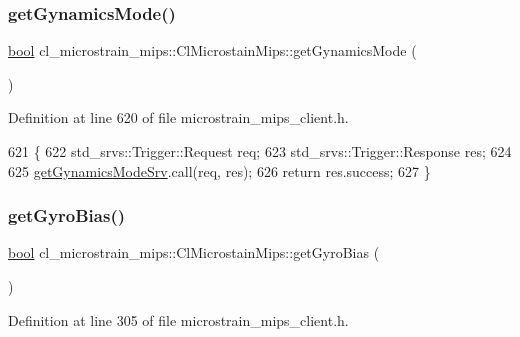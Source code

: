 \subsubsection{\texorpdfstring{get\+Gynamics\+Mode()}{getGynamicsMode()}}
{\footnotesize\ttfamily \hyperlink{classbool}{bool} cl\+\_\+microstrain\+\_\+mips\+::\+Cl\+Microstain\+Mips\+::get\+Gynamics\+Mode (\begin{DoxyParamCaption}{ }\end{DoxyParamCaption})\hspace{0.3cm}{\ttfamily [inline]}}



Definition at line 620 of file microstrain\+\_\+mips\+\_\+client.\+h.


\begin{DoxyCode}
621     \{
622         std\_srvs::Trigger::Request req;
623         std\_srvs::Trigger::Response res;
624 
625         \hyperlink{classcl__microstrain__mips_1_1ClMicrostainMips_a5ded1b1b3506d16e56d312b3d1a7fe13}{getGynamicsModeSrv}.call(req, res);
626         \textcolor{keywordflow}{return} res.success;
627     \}
\end{DoxyCode}
\mbox{\label{classcl__microstrain__mips_1_1ClMicrostainMips_aaa1e9015c879e48776a803f55add33e2}} 
\subsubsection{\texorpdfstring{get\+Gyro\+Bias()}{getGyroBias()}}
{\footnotesize\ttfamily \hyperlink{classbool}{bool} cl\+\_\+microstrain\+\_\+mips\+::\+Cl\+Microstain\+Mips\+::get\+Gyro\+Bias (\begin{DoxyParamCaption}{ }\end{DoxyParamCaption})\hspace{0.3cm}{\ttfamily [inline]}}



Definition at line 305 of file microstrain\+\_\+mips\+\_\+client.\+h.


